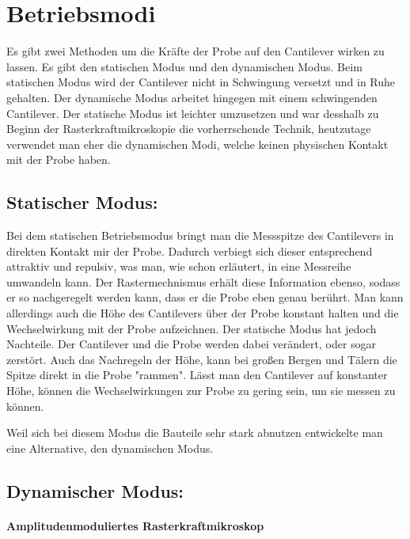 \section{Betriebsmodi}


Es gibt zwei Methoden um die Kräfte der Probe auf den Cantilever wirken zu lassen.
Es gibt den statischen Modus und den dynamischen Modus. 
Beim statischen Modus wird der Cantilever nicht in Schwingung versetzt und in Ruhe gehalten.
Der dynamische Modus arbeitet hingegen mit einem schwingenden Cantilever.
Der statische Modus ist leichter umzusetzen und war desshalb zu Beginn der Rasterkraftmikroskopie die vorherrschende Technik, heutzutage verwendet man eher die dynamischen Modi, welche keinen physischen Kontakt mit der Probe haben.


\subsection{Statischer Modus:}

Bei dem statischen Betriebsmodus bringt man die Messspitze des Cantilevers in direkten Kontakt mir der Probe.
Dadurch verbiegt sich dieser entsprechend attraktiv und repulsiv, was man, wie schon erläutert, in eine Messreihe umwandeln kann.
Der Rastermechnismus erhält diese Information ebenso, sodass er so nachgeregelt werden kann, dass er die Probe eben genau berührt.
Man kann allerdings auch die Höhe des Cantilevers über der Probe konstant halten und die Wechselwirkung mit der Probe aufzeichnen.
Der statische Modus hat jedoch Nachteile.
Der Cantilever und die Probe werden dabei verändert, oder sogar zerstört.
Auch das Nachregeln der Höhe, kann bei großen Bergen und Tälern die Spitze direkt in die Probe "rammen".
Lässt man den Cantilever auf konstanter Höhe, können die Wechselwirkungen zur Probe zu gering sein, um sie messen zu können.

Weil sich bei diesem Modus die Bauteile sehr stark abnutzen entwickelte man eine Alternative, den dynamischen Modus.

\subsection{Dynamischer Modus:}

       \paragraph{Amplitudenmoduliertes Rasterkraftmikroskop}

